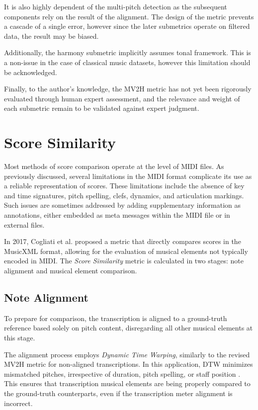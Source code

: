 It is also highly dependent of the multi-pitch detection as the subsequent components rely on the result of the alignment. The design of the metric prevents a cascade of a single error, however since the later submetrics operate on filtered data, the result may be biased.

Additionally, the harmony submetric implicitly assumes tonal framework. This is a non-issue in the case of classical music datasets, however this limitation should be acknowledged.

Finally, to the author’s knowledge, the MV2H metric has not yet been rigorously evaluated through human expert assessment, and the relevance and weight of each submetric remain to be validated against expert judgment.

\section{Score Similarity}

Most methods of score comparison operate at the level of MIDI files. As previously discussed, several limitations in the MIDI format complicate its use as a reliable representation of scores. These limitations include the absence of key and time signatures, pitch spelling, clefs, dynamics, and articulation markings. Such issues are sometimes addressed by adding supplementary information as annotations, either embedded as meta messages within the MIDI file or in external files.

In 2017, Cogliati et al. \cite{Cogliati2017} proposed a metric that directly compares scores in the MusicXML format, allowing for the evaluation of musical elements not typically encoded in MIDI. The \emph{Score Similarity} metric is calculated in two stages: note alignment and musical element comparison.

\subsection{Note Alignment}

To prepare for comparison, the transcription is aligned to a ground-truth reference based solely on pitch content, disregarding all other musical elements at this stage.

The alignment process employs \emph{Dynamic Time Warping}, similarly to the revised MV2H metric for non-aligned transcriptions. In this application, DTW minimizes mismatched pitches, irrespective of duration, pitch spelling, or staff position \cite[p. 409]{Cogliati2016}. This ensures that transcription musical elements are being properly compared to the ground-truth counterparts, even if the transcription meter alignment is incorrect.

